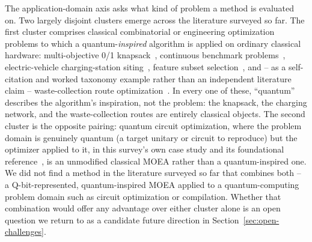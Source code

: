 The application-domain axis asks what kind of problem a method is
evaluated on. Two largely disjoint clusters emerge across the literature
surveyed so far. The first cluster comprises classical combinatorial or
engineering optimization problems to which a quantum-\emph{inspired}
algorithm is applied on ordinary classical hardware: multi-objective 0/1
knapsack~\citep{kim2006qmea}, continuous benchmark
problems~\citep{olvera2023continuous}, electric-vehicle
charging-station siting~\citep{kumar2026eahqnsga2}, feature subset
selection~\citep{vivek2025fss}, and -- as a self-citation and worked
taxonomy example rather than an independent literature claim --
waste-collection route optimization~\citep{gilea2026waste}. In every one
of these, ``quantum'' describes the algorithm's inspiration, not the
problem: the knapsack, the charging network, and the waste-collection
routes are entirely classical objects. The second cluster is the
opposite pairing: quantum circuit optimization, where the problem
domain is genuinely quantum (a target unitary or circuit to reproduce)
but the optimizer applied to it, in this survey's own case study and its
foundational reference~\citep{ghlib2026scalable}, is an unmodified
classical MOEA rather than a quantum-inspired one. We did not find a
method in the literature surveyed so far that combines both --
a Q-bit-represented, quantum-inspired MOEA applied to a quantum-computing
problem domain such as circuit optimization or compilation. Whether that
combination would offer any advantage over either cluster alone is an
open question we return to as a candidate future direction in
Section~\ref{sec:open-challenges}.
